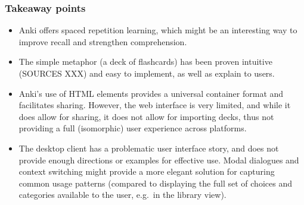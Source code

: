 \subsubsection{Takeaway points}

\begin{itemize}
\item Anki offers spaced repetition learning, which might be an interesting 
  way to improve recall and strengthen comprehension.
\item The simple metaphor (a deck of flashcards) has been proven intuitive 
  (SOURCES
  XXX) and easy to implement, as well as explain to users. %
\item Anki's use of HTML elements provides a universal container format and
  facilitates sharing. However, the web interface is very limited, and while it
  does allow for sharing, it does not allow for importing decks, thus not
  providing a full (isomorphic) user experience across platforms.
\item The desktop client has a problematic user interface story, and does not
  provide enough directions or examples for effective use. Modal dialogues and
  context switching might provide a more elegant solution for capturing common
  usage patterns (compared to displaying the full set of choices and categories
  available to the user, e.g.\ in the library view).
\end{itemize}

